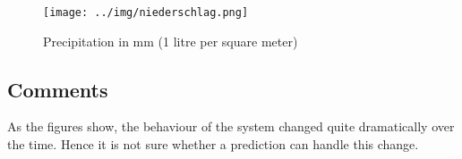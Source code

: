 \documentclass{scrartcl}
\begin{document}
\begin{figure}[H]
  \centering
  \texttt{[image: ../img/niederschlag.png]}
  \caption{Precipitation in mm (1 litre per square meter)}
\end{figure}

\subsection{Comments}
As the figures show, the behaviour of the system changed quite dramatically over the time. Hence it is not sure whether a prediction can handle this change.






%



%
\end{document}
